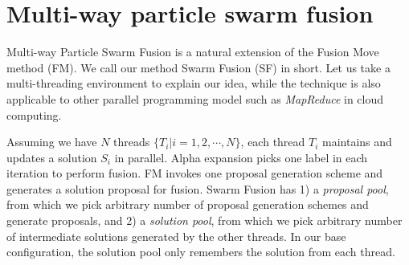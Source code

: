 \section{Multi-way particle swarm fusion}
Multi-way Particle Swarm Fusion is a natural extension of the Fusion
Move method (FM). We call our method Swarm Fusion (SF) in short. Let us
take a multi-threading environment to explain our idea, while the
technique is also applicable to other parallel programming model such as
{\it MapReduce} in cloud computing.
%

Assuming we have $N$ threads $\{T_i | i=1, 2, \cdots, N\}$, each thread
$T_i$ maintains and updates a solution $S_i$ in parallel. Alpha
expansion picks one label in each iteration to perform fusion. FM
invokes one proposal generation scheme and generates a solution proposal
for fusion. Swarm Fusion has 1) a {\it proposal pool}, from which we
pick arbitrary number of proposal generation schemes and generate
proposals, and 2) a {\it solution pool}, from which we pick arbitrary
number of intermediate solutions generated by the other threads.
%
%
In our base configuration, the solution pool only remembers the solution
from each thread.

